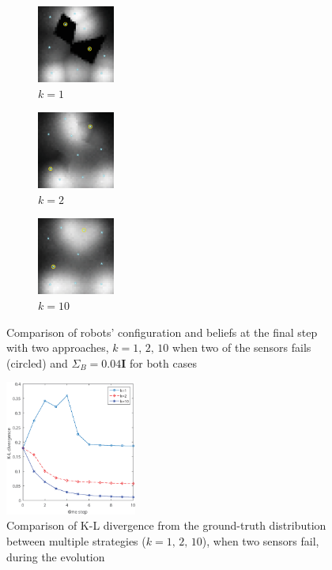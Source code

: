 \documentclass[journal]{IEEEtran}
\begin{document}
\begin{figure}
	\centering
	\begin{subfigure}[b]{0.15\textwidth}
		\centering
		\includegraphics[width=1in]{figure/fault_order_1}
		\caption{$k=1$}
	\end{subfigure}
	\begin{subfigure}[b]{0.15\textwidth}
		\centering
		\includegraphics[width=1in]{figure/fault_order_2}
		\caption{$k=2$}
	\end{subfigure}
	\begin{subfigure}[b]{0.15\textwidth}
	\centering
	\includegraphics[width=1in]{figure/fault_order_n}
	\caption{$k=10$}
\end{subfigure}
	\caption{Comparison of robots' configuration and beliefs at the final step with two approaches, $k=1, \,2,\,10$ when two of the sensors fails (circled) and $\Sigma_B = 0.04\mathbf{I}$ for both cases }
	\label{fig:fig6}
\end{figure}
\begin{figure}
	\centering
	\includegraphics[width=1.7in]{figure/fault_kl2}
	\caption{Comparison of K-L divergence from the ground-truth distribution between multiple strategies ($k=1,\,2,\,10$), when two sensors fail, during the evolution}
	\label{fig:fig7}
\end{figure}
\end{document}
